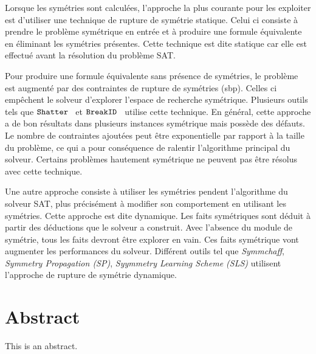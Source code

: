 Lorsque les symétries sont calculées, l'approche la plus courante pour les exploiter est d'utiliser une technique de rupture de symétrie statique. Celui ci consiste à prendre le problème symétrique en entrée et à produire une formule équivalente en éliminant les symétries présentes. Cette technique est dite 
statique car elle est effectué avant la résolution du problème SAT. 

Pour produire une formule équivalente sans présence de symétries, le problème est augmenté par des 
contraintes de rupture de  symétries (sbp). Celles ci empêchent le solveur d'explorer l'espace de recherche symétrique. Plusieurs outils tels que $\texttt{Shatter}$~\cite{} et $\texttt{BreakID}$~\cite{} utilise cette technique. En général, cette approche a de bon résultats dans plusieurs instances symétrique mais possède des défauts.
Le nombre de contraintes ajoutées peut être exponentielle par rapport à la taille du problème, ce qui a
pour conséquence de ralentir l'algorithme principal du solveur. Certains problèmes hautement symétrique
ne peuvent pas être résolus avec cette technique.

Une autre approche consiste à utiliser les symétries pendent l'algorithme du solveur SAT, plus précisément à modifier son comportement en utilisant les symétries.
Cette approche est dite dynamique.
 Les faits symétriques sont déduit
à partir des déductions que le solveur a construit. Avec l'absence du module de symétrie, tous les 
faits devront être explorer en vain. Ces faits symétrique vont augmenter les performances du solveur.
Différent outils tel que \textit{Symmchaff}, \textit{Symmetry Propagation (SP)}, \textit{Syymmetry Learning Scheme (SLS)} utilisent l'approche de rupture de symétrie dynamique.


\chapter*{Abstract}

This is an abstract.